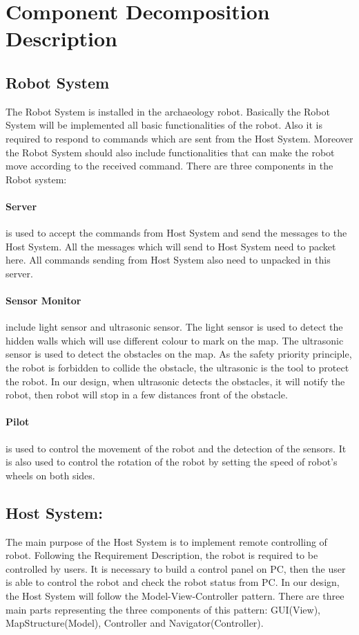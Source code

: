 \documentclass[11pt, a4paper]{report}
\begin{document}
\section{Component Decomposition Description}
\subsection{Robot System}
The Robot System is installed in the archaeology robot. Basically the Robot System will be implemented all basic functionalities of the robot. Also it is required to respond to commands which are sent from the Host System. Moreover the Robot System should also include functionalities that can make the robot move according to the received command. There are three components in the Robot system:
\paragraph {Server} is used to accept the commands from Host System and send the messages to the Host System. All the messages which will send to Host System need to packet here. All commands sending from Host System also need to unpacked in this server.
\paragraph {Sensor Monitor} include light sensor and ultrasonic sensor. The light sensor is used to detect the hidden walls which will use different colour to mark on the map. The ultrasonic sensor is used to detect the obstacles on the map. As the safety priority principle, the robot is forbidden to collide the obstacle, the ultrasonic is the tool to protect the robot. In our design, when ultrasonic detects the obstacles, it will notify the robot, then robot will stop in a few distances front of the obstacle.
\paragraph {Pilot} is used to control the movement of the robot and the detection of the sensors. It is also used to control the rotation of the robot by setting the speed of robot's wheels on both sides.      


\subsection{Host System: }
The main purpose of the Host System is to implement remote controlling of robot. Following the Requirement Description, the robot is required to be controlled by users. It is necessary to build a control panel on PC, then the user is able to control the robot and check the robot status from PC. In our design, the Host System will follow the Model-View-Controller pattern. There are three main parts representing the three components of this pattern: GUI(View), MapStructure(Model), Controller and Navigator(Controller).    
\newline
\end{document}
